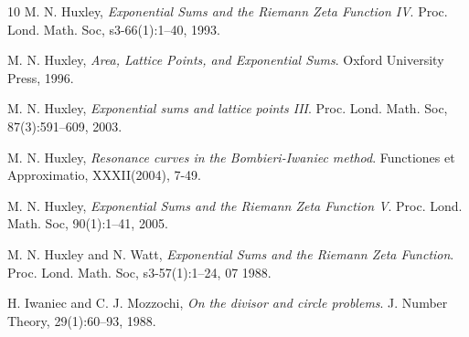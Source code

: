 \documentclass[11pt]{amsart}
\numberwithin{equation}{section}
\theoremstyle{definition}
\theoremstyle{proposition}
\begin{document}
\begin{thebibliography}{10}
 M. N. Huxley, {\it Exponential Sums and the Riemann Zeta Function IV}. Proc. Lond. Math. Soc, s3-66(1):1–40, 1993.

 M. N. Huxley, {\it Area, Lattice Points, and Exponential Sums}. Oxford University Press, 1996.

 M. N. Huxley, {\it Exponential sums and lattice points III}. Proc. Lond. Math. Soc, 87(3):591–609, 2003.

 M. N. Huxley, {\it Resonance curves in the Bombieri-Iwaniec method}. Functiones et Approximatio, XXXII(2004), 7-49. 

 M. N. Huxley, {\it Exponential Sums and the Riemann Zeta Function V}. Proc. Lond. Math. Soc, 90(1):1–41, 2005.

 M. N. Huxley and N. Watt, {\it Exponential Sums and the Riemann Zeta Function}. Proc. Lond. Math. Soc, s3-57(1):1–24, 07 1988. 

 H. Iwaniec and C. J. Mozzochi, {\it On the divisor and circle problems}. J. Number Theory, 29(1):60–93, 1988. 










\end{thebibliography}
\end{document}
